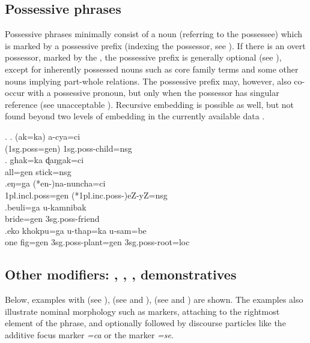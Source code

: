 \subsection{Possessive phrases}\label{str-np-poss}

Possessive phrases minimally consist  of a noun (referring to the possessee) which is marked by a possessive prefix (indexing the possessor, see \Next[a]). If there is an overt possessor, marked by the , the possessive prefix is generally optional (see \Next[b]), except for inherently possessed nouns such as core family terms and some other nouns implying part-whole relations. The possessive prefix may, however, also  co-occur with a possessive pronoun, but only when the possessor has singular reference (see unacceptable \Next[c]). Recursive embedding is possible as well, but not found beyond two levels of embedding in the currently available data \Next[e].

\ex. \ag. (ak=ka)        a-cya=ci\\
({\sc 1sg.poss=gen}) {\sc 1sg.poss-}child{\sc =nsg}\\
 
\bg. ghak=ka    ɖaŋgak=ci\\
all{\sc =gen} stick{\sc =nsg}\\
 
\bg.eŋ=ga              (*en-)na-nuncha=ci\\
{\sc 1pl.incl.poss=gen} (*{\sc 1pl.inc.poss-})eZ-yZ{\sc =nsg}\\
 
\bg.beuli=ga    u-kamnibak\\ 
bride{\sc =gen} {\sc 3sg.poss-}friend\\
\bg.eko khokpu=ga      u-thap=ka              u-sam=be\\
one fig{\sc =gen} {\sc 3sg.poss-}plant{\sc =gen} {\sc 3sg.poss-}root{\sc =loc}\\
 

\subsection{Other modifiers: , , , demonstratives}\label{str-np-mod}

Below, examples with  (see \Next[a]),  (see \Next[b] and \Next[c]),  (see \Next[d] and \Next[e]) are shown. The examples also illustrate nominal morphology such as  markers, attaching to the rightmost element of the phrase, and optionally followed by discourse particles like the additive focus marker \emph{=ca} or the  marker \emph{=se}.


